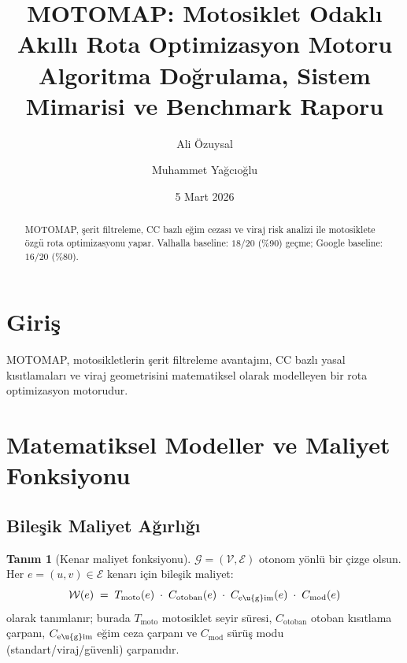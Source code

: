\documentclass[11pt,a4paper]{article}
\title{\textbf{MOTOMAP: Motosiklet Odakl{\i} Ak{\i}ll{\i} Rota
       Optimizasyon Motoru}\\[6pt]
       \large Algoritma Do\u{g}rulama, Sistem Mimarisi ve
              Benchmark Raporu}
\author{Ali \"Ozuysal \and Muhammet Ya\u{g}c{\i}o\u{g}lu}
\date{5 Mart 2026}
\newcommand{\WW}{\mathcal{W}}
\newcommand{\GG}{\mathcal{G}}
\newcommand{\EE}{\mathcal{E}}
\newcommand{\VV}{\mathcal{V}}
\theoremstyle{definition}
\newtheorem{definition}{Tan{\i}m}[section]
\begin{document}
\maketitle

\begin{abstract}
MOTOMAP, \c{s}erit filtreleme, CC bazl{\i} e\u{g}im cezas{\i} ve
viraj risk analizi ile motosiklete \"ozg\"u rota optimizasyonu yapar.
Valhalla baseline: $18/20$ (\%90) ge\c{c}me; Google baseline: $16/20$ (\%80).
\end{abstract}

\tableofcontents
\newpage

\section{Giri\c{s}}\label{sec:intro}

MOTOMAP, motosikletlerin \c{s}erit filtreleme avantaj{\i}n{\i},
CC bazl{\i} yasal k{\i}s{\i}tlamalar{\i} ve viraj geometrisini
matematiksel olarak modelleyen bir rota optimizasyon motorudur.

\section{Matematiksel Modeller ve Maliyet Fonksiyonu}\label{sec:math}

\subsection{Bile\c{s}ik Maliyet A\u{g}{\i}rl{\i}\u{g}{\i}}

\begin{definition}[Kenar maliyet fonksiyonu]
$\GG=(\VV,\EE)$ otonom y\"onl\"u bir \c{c}izge olsun. Her $e=(u,v)\in\EE$
kenar{\i} i\c{c}in bileşik maliyet:
\begin{equation}\label{eq:cost}
  \WW(e)
  \;=\;
  T_{\mathrm{moto}}(e)
  \;\cdot\;
  C_{\mathrm{otoban}}(e)
  \;\cdot\;
  C_{\mathrm{e\u{g}im}}(e)
  \;\cdot\;
  C_{\mathrm{mod}}(e)
\end{equation}
olarak tan{\i}mlan{\i}r; burada
$T_{\mathrm{moto}}$ motosiklet seyir s\"uresi,
$C_{\mathrm{otoban}}$ otoban k{\i}s{\i}tlama \c{c}arpan{\i},
$C_{\mathrm{e\u{g}im}}$ e\u{g}im ceza \c{c}arpan{\i} ve
$C_{\mathrm{mod}}$ s\"ur\"u\c{s} modu (standart/viraj/g\"uvenli)
\c{c}arpan{\i}d{\i}r.
\end{definition}
\end{document}
